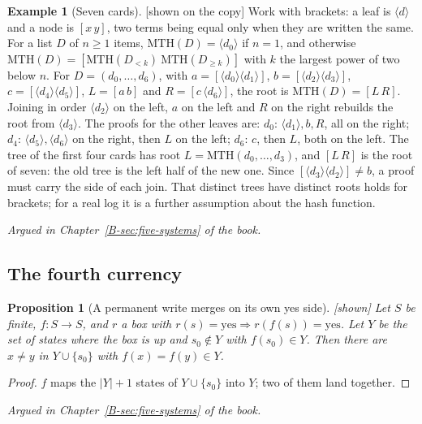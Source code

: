 \documentclass[11pt, a4paper]{article}
\theoremstyle{plain}
\newtheorem{proposition}[theorem]{Proposition}
\theoremstyle{definition}
\newtheorem{example}[theorem]{Example}
\theoremstyle{remark}
\newcommand{\rd}{r}
\newcommand{\argued}[1]{\par\noindent\textit{Argued in Chapter~\ref{B-#1} of the book.}\par}
\newcommand{\kind}[1]{\textup{[#1]}}
\begin{document}
\begin{example}[Seven cards]\label{spec:merkle} \kind{shown on the copy}
Work with brackets: a leaf is $\langle d\rangle$ and a node is $[x\,y]$, two terms being equal only when they
are written the same. For a list $D$ of $n\ge1$ items, $\mathrm{MTH}(D)=\langle d_0\rangle$ if $n=1$, and
otherwise $\mathrm{MTH}(D)=[\mathrm{MTH}(D_{<k})\ \mathrm{MTH}(D_{\ge k})]$ with $k$ the largest power of two
below $n$. For $D=(d_0,\dots,d_6)$, with $a=[\langle d_0\rangle\langle d_1\rangle]$,
$b=[\langle d_2\rangle\langle d_3\rangle]$, $c=[\langle d_4\rangle\langle d_5\rangle]$, $L=[a\,b]$ and
$R=[c\,\langle d_6\rangle]$, the root is $\mathrm{MTH}(D)=[L\,R]$. Joining in order
$\langle d_2\rangle$ on the left, $a$ on the left and $R$ on the right rebuilds the root from
$\langle d_3\rangle$. The proofs for the other leaves are: $d_0$: $\langle d_1\rangle,b,R$, all on the right;
$d_4$: $\langle d_5\rangle,\langle d_6\rangle$ on the right, then $L$ on the left; $d_6$: $c$, then $L$, both on
the left. The tree of the first four cards has root $L=\mathrm{MTH}(d_0,\dots,d_3)$, and $[L\,R]$ is the root of
seven: the old tree is the left half of the new one. Since $[\langle d_3\rangle\langle d_2\rangle]\ne b$, a proof
must carry the side of each join. That distinct trees have distinct roots holds for brackets; for a real log
it is a further assumption about the hash function.
\end{example}

\argued{sec:five-systems}

\subsection*{The fourth currency}

\begin{proposition}[A permanent write merges on its own yes side]\label{spec:yes-side} \kind{shown}
Let $S$ be finite, $f:S\to S$, and $\rd$ a box with $\rd(s)=\mathrm{yes}\Rightarrow\rd(f(s))=\mathrm{yes}$.
Let $Y$ be the set of states where the box is up and $s_0\notin Y$ with $f(s_0)\in Y$. Then there are
$x\ne y$ in $Y\cup\{s_0\}$ with $f(x)=f(y)\in Y$.
\end{proposition}

\begin{proof}
$f$ maps the $|Y|+1$ states of $Y\cup\{s_0\}$ into $Y$; two of them land together.
\end{proof}

\argued{sec:five-systems}
\end{document}
